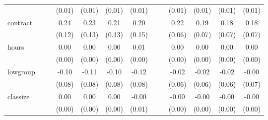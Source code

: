 \documentclass{article}
\begin{document}
{\begin{tabular}{l*{12}{c}}
            &                     &                     &      (0.01)         &      (0.01)         &      (0.01)         &      (0.01)         &                     &                     &      (0.01)         &      (0.01)         &      (0.01)         &      (0.01)         \\
[1em]
contract    &                     &                     &        0.24\sym{*}  &        0.23\sym{*}  &        0.21         &        0.20         &                     &                     &        0.22\sym{***}&        0.19\sym{***}&        0.18\sym{***}&        0.18\sym{***}\\
            &                     &                     &      (0.12)         &      (0.13)         &      (0.13)         &      (0.15)         &                     &                     &      (0.06)         &      (0.07)         &      (0.07)         &      (0.07)         \\
[1em]
hours       &                     &                     &        0.00         &        0.00         &        0.00         &        0.01         &                     &                     &        0.00         &        0.00         &        0.00         &        0.00         \\
            &                     &                     &      (0.00)         &      (0.00)         &      (0.00)         &      (0.00)         &                     &                     &      (0.00)         &      (0.00)         &      (0.00)         &      (0.00)         \\
[1em]
lowgroup    &                     &                     &       -0.10         &       -0.11         &       -0.10         &       -0.12         &                     &                     &       -0.02         &       -0.02         &       -0.02         &       -0.00         \\
            &                     &                     &      (0.08)         &      (0.08)         &      (0.08)         &      (0.08)         &                     &                     &      (0.06)         &      (0.06)         &      (0.06)         &      (0.07)         \\
[1em]
classize    &                     &                     &        0.00         &        0.00         &        0.00         &       -0.00         &                     &                     &       -0.00         &       -0.00         &       -0.00         &       -0.00         \\
            &                     &                     &      (0.00)         &      (0.00)         &      (0.00)         &      (0.01)         &                     &                     &      (0.00)         &      (0.00)         &      (0.00)         &      (0.00)         \\

\end{tabular}}
\end{document}
